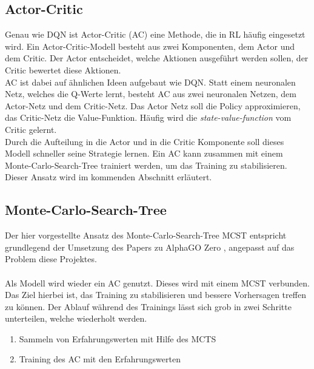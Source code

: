 \subsection{Actor-Critic}
Genau wie DQN ist Actor-Critic (AC) eine Methode, die in RL häufig eingesetzt wird.
Ein Actor-Critic-Modell besteht aus zwei Komponenten, dem Actor und dem Critic. Der Actor entscheidet, welche Aktionen ausgeführt werden sollen, der Critic bewertet diese Aktionen. 
\\
AC ist dabei auf ähnlichen Ideen aufgebaut wie DQN. Statt einem neuronalen Netz, welches die Q-Werte lernt, besteht AC aus zwei neuronalen Netzen, dem Actor-Netz und dem Critic-Netz. Das Actor Netz soll die Policy approximieren, das Critic-Netz die Value-Funktion. Häufig wird die \textit{state-value-function} vom Critic gelernt. 
\\
Durch die Aufteilung in die Actor und in die Critic Komponente soll dieses Modell schneller seine Strategie lernen. 
Ein AC kann zusammen mit einem Monte-Carlo-Search-Tree trainiert werden, um das Training zu stabilisieren. Dieser Ansatz wird im kommenden Abschnitt erläutert.

\subsection{Monte-Carlo-Search-Tree}
Der hier vorgestellte Ansatz des Monte-Carlo-Search-Tree MCST entspricht grundlegend der Umsetzung des Papers zu AlphaGO Zero , angepasst auf das Problem diese Projektes.
\\\\
Als Modell wird wieder ein AC genutzt. Dieses wird mit einem MCST verbunden. Das Ziel hierbei ist, das Training zu stabilisieren und bessere Vorhersagen treffen zu können. Der Ablauf während des Trainings lässt sich grob in zwei Schritte unterteilen, welche wiederholt werden.
\begin{enumerate}
	\item Sammeln von Erfahrungswerten mit Hilfe des MCTS
	\item Training des AC mit den Erfahrungswerten
\end{enumerate}
